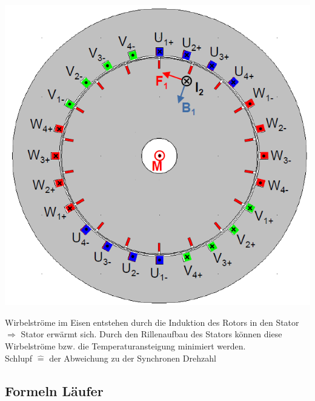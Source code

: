 \begin{multicols}{3}
        \begin{minipage}{\linewidth}
            \includegraphics[width=\linewidth]{images/QuerschnittAmotor}
        \end{minipage}
    \end{multicols}
    Wirbelströme im Eisen entstehen durch die Induktion des Rotors in den Stator \newline
    $\Rightarrow$ Stator erwärmt sich.\newline
    Durch den Rillenaufbau des Stators können diese Wirbelströme bzw. die Temperaturansteigung minimiert werden.
    \\
    Schlupf $\widehat{=}$ der Abweichung zu der Synchronen Drehzahl 
    \clearpage
    \pagebreak

\subsection{Formeln Läufer}
\renewcommand{\arraystretch}{1}
